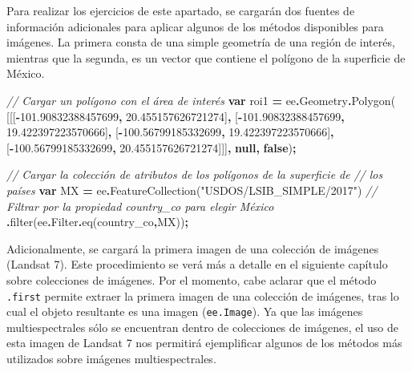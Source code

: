 \documentclass[
  12pt,
  letterpaper,
  twoside]{book}
\newenvironment{Shaded}{\begin{snugshade}}{\end{snugshade}}
\newcommand{\AttributeTok}[1]{\textcolor[rgb]{0.77,0.63,0.00}{#1}}
\newcommand{\CommentTok}[1]{\textcolor[rgb]{0.56,0.35,0.01}{\textit{#1}}}
\newcommand{\FloatTok}[1]{\textcolor[rgb]{0.00,0.00,0.81}{#1}}
\newcommand{\FunctionTok}[1]{\textcolor[rgb]{0.00,0.00,0.00}{#1}}
\newcommand{\KeywordTok}[1]{\textcolor[rgb]{0.13,0.29,0.53}{\textbf{#1}}}
\newcommand{\NormalTok}[1]{#1}
\newcommand{\OperatorTok}[1]{\textcolor[rgb]{0.81,0.36,0.00}{\textbf{#1}}}
\newcommand{\StringTok}[1]{\textcolor[rgb]{0.31,0.60,0.02}{#1}}
\begin{document}
Para realizar los ejercicios de este apartado, se cargarán dos fuentes de información adicionales para aplicar algunos de los métodos disponibles para imágenes. La primera consta de una simple geometría de una región de interés, mientras que la segunda, es un vector que contiene el polígono de la superficie de México.

\begin{Shaded}
\begin{Highlighting}[]
\CommentTok{// Cargar un polígono con el área de interés}
\KeywordTok{var}\NormalTok{ roi1 }\OperatorTok{=}\NormalTok{ ee}\OperatorTok{.}\AttributeTok{Geometry}\OperatorTok{.}\FunctionTok{Polygon}\NormalTok{(}
\NormalTok{        [[[}\OperatorTok{{-}}\FloatTok{101.90832388457699}\OperatorTok{,} \FloatTok{20.455157626721274}\NormalTok{]}\OperatorTok{,}
\NormalTok{          [}\OperatorTok{{-}}\FloatTok{101.90832388457699}\OperatorTok{,} \FloatTok{19.422397223570666}\NormalTok{]}\OperatorTok{,}
\NormalTok{          [}\OperatorTok{{-}}\FloatTok{100.56799185332699}\OperatorTok{,} \FloatTok{19.422397223570666}\NormalTok{]}\OperatorTok{,}
\NormalTok{          [}\OperatorTok{{-}}\FloatTok{100.56799185332699}\OperatorTok{,} \FloatTok{20.455157626721274}\NormalTok{]]]}\OperatorTok{,} \KeywordTok{null}\OperatorTok{,} \KeywordTok{false}\NormalTok{)}\OperatorTok{;}

\CommentTok{// Cargar la colección de atributos de los polígonos de la superficie de }
\CommentTok{// los países}
\KeywordTok{var}\NormalTok{ MX }\OperatorTok{=}\NormalTok{ ee}\OperatorTok{.}\FunctionTok{FeatureCollection}\NormalTok{(}\StringTok{"USDOS/LSIB\_SIMPLE/2017"}\NormalTok{)}
  \CommentTok{// Filtrar por la propiedad country\_co para elegir México}
  \OperatorTok{.}\FunctionTok{filter}\NormalTok{(ee}\OperatorTok{.}\AttributeTok{Filter}\OperatorTok{.}\FunctionTok{eq}\NormalTok{(}\StringTok{\textquotesingle{}country\_co\textquotesingle{}}\OperatorTok{,}\StringTok{\textquotesingle{}MX\textquotesingle{}}\NormalTok{))}\OperatorTok{;}
\end{Highlighting}
\end{Shaded}

Adicionalmente, se cargará la primera imagen de una colección de imágenes (Landsat 7). Este procedimiento se verá más a detalle en el siguiente capítulo sobre colecciones de imágenes. Por el momento, cabe aclarar que el método \texttt{.first} permite extraer la primera imagen de una colección de imágenes, tras lo cual el objeto resultante es una imagen (\texttt{ee.Image}). Ya que las imágenes multiespectrales sólo se encuentran dentro de colecciones de imágenes, el uso de esta imagen de Landsat 7 nos permitirá ejemplificar algunos de los métodos más utilizados sobre imágenes multiespectrales.
\end{document}

